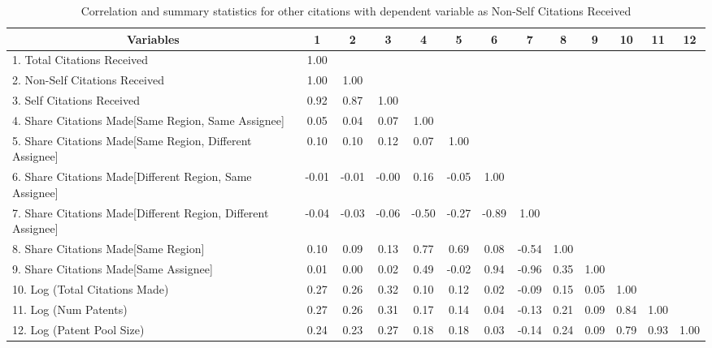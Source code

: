 \begin{sidewaystable}[htbp]\centering \caption{Correlation and summary statistics for other citations with dependent variable as Non-Self Citations Received\label{o.ncorrelation}}
\scriptsize
\singlespacing
\begin{tabular}{l  c  c  c  c  c  c  c  c  c  c  c  c }\hline\hline
\multicolumn{1}{c}{Variables} &1&2&3&4&5&6&7&8&9&10&11&12\\ \hline
1. Total Citations Received&1.00\\
2. Non-Self Citations Received&1.00&1.00\\
3. Self Citations Received&0.92&0.87&1.00\\
4. Share Citations Made[Same Region, Same Assignee]&0.05&0.04&0.07&1.00\\
5. Share Citations Made[Same Region, Different Assignee]&0.10&0.10&0.12&0.07&1.00\\
6. Share Citations Made[Different Region, Same Assignee]&-0.01&-0.01&-0.00&0.16&-0.05&1.00\\
7. Share Citations Made[Different Region, Different Assignee]&-0.04&-0.03&-0.06&-0.50&-0.27&-0.89&1.00\\
8. Share Citations Made[Same Region]&0.10&0.09&0.13&0.77&0.69&0.08&-0.54&1.00\\
9. Share Citations Made[Same Assignee]&0.01&0.00&0.02&0.49&-0.02&0.94&-0.96&0.35&1.00\\
10. Log (Total Citations Made)&0.27&0.26&0.32&0.10&0.12&0.02&-0.09&0.15&0.05&1.00\\
11. Log (Num Patents)&0.27&0.26&0.31&0.17&0.14&0.04&-0.13&0.21&0.09&0.84&1.00\\
12. Log (Patent Pool Size)&0.24&0.23&0.27&0.18&0.18&0.03&-0.14&0.24&0.09&0.79&0.93&1.00\\
\hline \hline 
 \end{tabular}
\end{sidewaystable}
